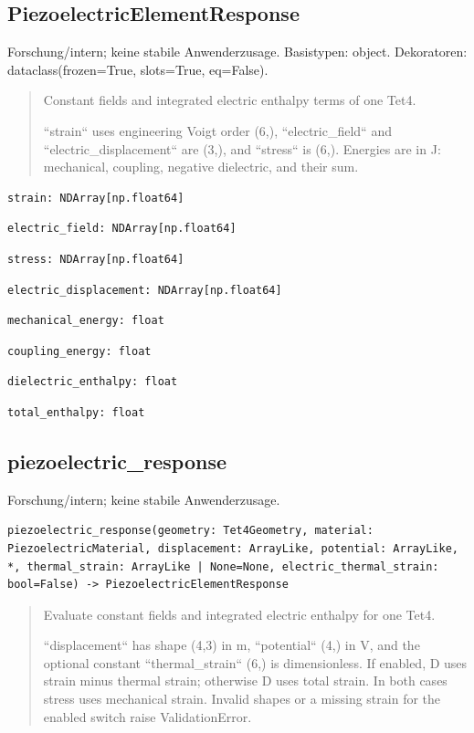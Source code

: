 \subsection{PiezoelectricElementResponse}
Forschung/intern; keine stabile Anwenderzusage.
Basistypen: object. Dekoratoren: dataclass(frozen=True, slots=True, eq=False).
\begin{quote}
Constant fields and integrated electric enthalpy terms of one Tet4.\par ``strain`` uses engineering Voigt order (6,), ``electric\_field`` and ``electric\_displacement`` are (3,), and ``stress`` is (6,). Energies are in J: mechanical, coupling, negative dielectric, and their sum.
\end{quote}
\begin{lstlisting}
strain: NDArray[np.float64]
\end{lstlisting}
\begin{lstlisting}
electric_field: NDArray[np.float64]
\end{lstlisting}
\begin{lstlisting}
stress: NDArray[np.float64]
\end{lstlisting}
\begin{lstlisting}
electric_displacement: NDArray[np.float64]
\end{lstlisting}
\begin{lstlisting}
mechanical_energy: float
\end{lstlisting}
\begin{lstlisting}
coupling_energy: float
\end{lstlisting}
\begin{lstlisting}
dielectric_enthalpy: float
\end{lstlisting}
\begin{lstlisting}
total_enthalpy: float
\end{lstlisting}
\subsection{piezoelectric\_response}
Forschung/intern; keine stabile Anwenderzusage.
\begin{lstlisting}
piezoelectric_response(geometry: Tet4Geometry, material: PiezoelectricMaterial, displacement: ArrayLike, potential: ArrayLike, *, thermal_strain: ArrayLike | None=None, electric_thermal_strain: bool=False) -> PiezoelectricElementResponse
\end{lstlisting}
\begin{quote}
Evaluate constant fields and integrated electric enthalpy for one Tet4.\par ``displacement`` has shape (4,3) in m, ``potential`` (4,) in V, and the optional constant ``thermal\_strain`` (6,) is dimensionless. If enabled, D uses strain minus thermal strain; otherwise D uses total strain. In both cases stress uses mechanical strain. Invalid shapes or a missing strain for the enabled switch raise ValidationError.
\end{quote}

